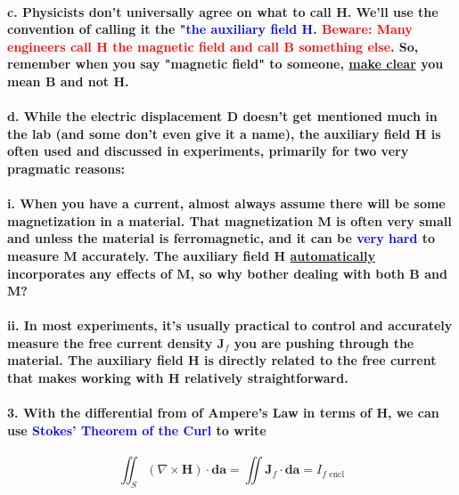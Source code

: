 \documentclass{article}
\begin{document}
\paragraph{\indent c. Physicists don't universally agree on what to call $\boldsymbol{H}$. We'll use the convention of calling it the "\textcolor{blue}{the auxiliary field $\boldsymbol{H}$}. \textcolor{red}{Beware: Many engineers call $\boldsymbol{H}$ the magnetic field and call $\boldsymbol{B}$ something else}. So, remember when you say "magnetic field" to someone, \underline{make clear} you mean $\boldsymbol{B}$ and not $\boldsymbol{H}$.}
\paragraph{\indent d. While the electric displacement $\boldsymbol{D}$ doesn't get mentioned much in the lab (and some don't even give it a name), the auxiliary field $\boldsymbol{H}$ is often used and discussed in experiments, primarily for two very pragmatic reasons:}
\paragraph{\indent\indent i. When you have a current, almost always assume there will be some magnetization in a material. That magnetization $\boldsymbol{M}$ is often very small and unless the material is ferromagnetic, and it can be \textcolor{blue}{very hard} to measure $\boldsymbol{M}$ accurately. The auxiliary field $\boldsymbol{H}$ \underline{automatically} incorporates any effects of $\boldsymbol{M}$, so why bother dealing with both $\boldsymbol{B}$ and $\boldsymbol{M}$?}
\paragraph{\indent\indent ii. In most experiments, it's usually practical to control and accurately measure the free current density $\boldsymbol{J}_f$ you are pushing through the material. The auxiliary field $\boldsymbol{H}$ is directly related to the free current that makes working with $\boldsymbol{H}$ relatively straightforward.}
\paragraph{3. With the differential from of Ampere's Law in terms of $\boldsymbol{H}$, we can use \textcolor{blue}{Stokes' Theorem of the Curl} to write}
\begin{equation*}
    \iint_S(\nabla\times\boldsymbol{H})\cdot\boldsymbol{da}=\iint\boldsymbol{J}_f\cdot\boldsymbol{da}=I_{f\text{  encl}}
\end{equation*}
\end{document}
